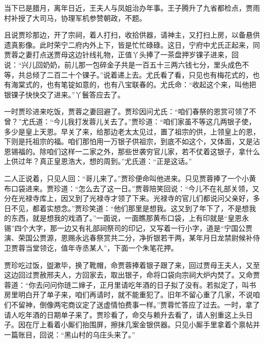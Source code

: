 当下已是腊月，离年日近，王夫人与凤姐治办年事。王子腾升了九省都检点，贾雨村补授了大司马，协理军机参赞朝政，不题。

且说贾珍那边，开了宗祠，着人打扫，收拾供器，请神主，又打扫上房，以备悬供遗真影像。此时荣宁二府内外上下，皆是忙忙碌碌。这日，宁府中尤氏正起来，同贾蓉之妻打点送贾母这边针线礼物，正值丫头捧了一茶盘押岁锞子进来，回说：``兴儿回奶奶，前儿那一包碎金子共是一百五十三两六钱七分，里头成色不等，共总倾了二百二十个锞子。''说着递上去。尤氏看了看，只见也有梅花式的，也有海棠式的，也有笔锭如意的，也有八宝联春的。尤氏命：``收起这个来，叫他把银锞子快快交了进来。''丫鬟答应去了。

一时贾珍进来吃饭，贾蓉之妻回避了。贾珍因问尤氏：``咱们春祭的恩赏可领了不曾？''尤氏道：``今儿我打发蓉儿关去了。''贾珍道：``咱们家虽不等这几两银子使，多少是皇上天恩。早关了来，给那边老太太见过，置了祖宗的供，上领皇上的恩，下则是托祖宗的福。咱们那怕用一万银子供祖宗，到底不如这个，又体面，又是沾恩锡福的。除咱们这样一二家之外，那些世袭穷官儿家，若不仗着这银子，拿什么上供过年？真正皇恩浩大，想的周到。''尤氏道：``正是这话。''

二人正说着，只见人回：``哥儿来了。''贾珍便命叫他进来。只见贾蓉捧了一个小黄布口袋进来。贾珍道：``怎么去了这一日。''贾蓉陪笑回说：``今儿不在礼部关领，又分在光禄寺库上，因又到了光禄寺才领了下来。光禄寺的官儿们都说问父亲好，多日不见，都着实想念。''贾珍笑道：``他们那里是想我。这又到了年下了，不是想我的东西，就是想我的戏酒了。''一面说，一面瞧那黄布口袋，上有印就是``皇恩永锡''四个大字，那一边又有礼部祠祭司的印记，又写着一行小字，道是``宁国公贾演、荣国公贾源，恩赐永远春祭赏共二分，净折银若干两，某年月日龙禁尉候补侍卫贾蓉当堂领讫，值年寺丞某人''，下面一个朱笔花押。

贾珍吃过饭，盥漱毕，换了靴帽，命贾蓉捧着银子跟了来，回过贾母王夫人，又至这边回过贾赦邢夫人，方回家去，取出银子，命将口袋向宗祠大炉内焚了。又命贾蓉道：``你去问问你琏二婶子，正月里请吃年酒的日子拟了没有。若拟定了，叫书房里明白开了单子来，咱们再请时，就不能重犯了。旧年不留心重了几家，不说咱们不留神，倒像两宅商议定了送虚情怕费事一样。''贾蓉忙答应了过去。一时，拿了请人吃年酒的日期单子来了。贾珍看了，命交与赖升去看了，请人别重这上头日子。因在厅上看着小厮们抬围屏，擦抹几案金银供器。只见小厮手里拿着个禀帖并一篇账目，回说：``黑山村的乌庄头来了。''

